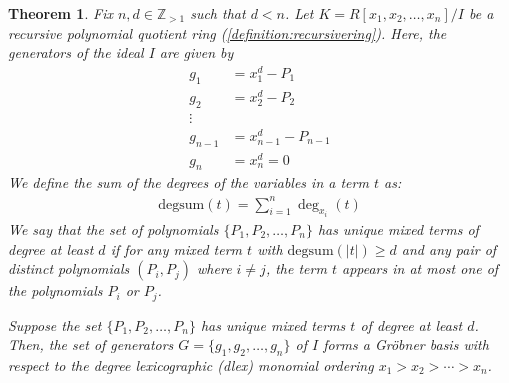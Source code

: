 \documentclass[12pt,reqno]{article}
\theoremstyle{plain}
\newtheorem{theorem}{Theorem}
\newcommand{\degsum}{\mathrm{degsum}}
\begin{document}
\begin{theorem} \label{proof:grobnerbasis}
Fix $n,d \in \mathbb{Z}_{>1}$ such that $d < n$. Let $K = R[x_1, x_2, \ldots, x_n]/I$ be a recursive polynomial quotient ring (\cref{definition:recursivering}). Here, the generators of the ideal $I$ are given by
\begin{align*}
    g_1 &= x_1^d - P_1 \\
    g_2 &= x_2^d - P_2 \\
    \vdots & \\
    g_{n-1} &= x_{n-1}^d - P_{n-1} \\
    g_n &= x_n^d = 0
\end{align*}
We define the sum of the degrees of the variables in a term $t$ as:
\begin{align*}
    \mathrm{degsum}(t) = \sum_{i=1}^n \deg_{x_i}(t)
\end{align*}
We say that the set of polynomials $\{ P_1, P_2, \ldots, P_n \}$ has unique mixed terms of degree at least $d$ if for any mixed term $t$ with $\degsum(|t|) \geq d$ and any pair of distinct polynomials $(P_i,P_j)$ where $i \neq j$, the term $t$ appears in at most one of the polynomials $P_i$ or $P_j$.

Suppose the set $\{ P_1, P_2, \ldots, P_n \}$ has unique mixed terms $t$ of degree at least $d$. Then, the set of generators $G = \{ g_1, g_2, \ldots, g_n \}$ of $I$ forms a Gröbner basis with respect to the degree lexicographic (dlex) monomial ordering $x_1 > x_2 > \cdots > x_n$.
\end{theorem}
\end{document}
